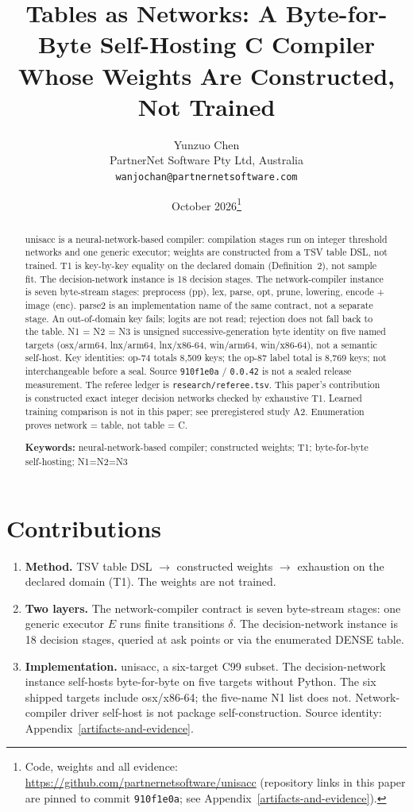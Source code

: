 \documentclass[11pt]{article}
\title{Tables as Networks: A Byte-for-Byte Self-Hosting C Compiler Whose Weights Are Constructed, Not Trained}
\author{Yunzuo Chen\\
PartnerNet Software Pty Ltd, Australia\\
\texttt{wanjochan@partnernetsoftware.com}}
\date{October 2026\thanks{Code, weights and all evidence: \url{https://github.com/partnernetsoftware/unisacc} (repository links in this paper are pinned to commit \texttt{910f1e0a}; see Appendix~\ref{artifacts-and-evidence}).}}
\begin{document}
\maketitle

\begin{abstract}
unisacc is a neural-network-based compiler: compilation stages run on integer threshold networks and one generic executor; weights are constructed from a TSV table DSL, not trained. T1 is key-by-key equality on the declared domain (Definition~2), not sample fit. The decision-network instance is 18 decision stages. The network-compiler instance is seven byte-stream stages: preprocess (pp), lex, parse, opt, prune, lowering, encode + image (enc). parse2 is an implementation name of the same contract, not a separate stage. An out-of-domain key fails; logits are not read; rejection does not fall back to the table. N1 = N2 = N3 is unsigned successive-generation byte identity on five named targets (osx/arm64, lnx/arm64, lnx/x86-64, win/arm64, win/x86-64), not a semantic self-host. Key identities: op-74 totals 8,509 keys; the op-87 label total is 8,769 keys; not interchangeable before a seal. Source \texttt{910f1e0a} / \texttt{0.0.42} is not a sealed release measurement. The referee ledger is \texttt{research/referee.tsv}. This paper's contribution is constructed exact integer decision networks checked by exhaustive T1. Learned training comparison is not in this paper; see preregistered study A2. Enumeration proves network = table, not table = C.

\medskip
\noindent\textbf{Keywords:} neural-network-based compiler; constructed weights; T1; byte-for-byte self-hosting; N1=N2=N3
\end{abstract}

\section{Contributions}\label{introduction}

\begin{enumerate}
\item \textbf{Method.} TSV table DSL $\to$ constructed weights $\to$ exhaustion on the declared domain (T1). The weights are not trained.
\item \textbf{Two layers.} The network-compiler contract is seven byte-stream stages: one generic executor $E$ runs finite transitions $\delta$. The decision-network instance is 18 decision stages, queried at ask points or via the enumerated DENSE table.
\item \textbf{Implementation.} unisacc, a six-target C99 subset. The decision-network instance self-hosts byte-for-byte on five targets without Python. The six shipped targets include osx/x86-64; the five-name N1 list does not. Network-compiler driver self-host is not package self-construction. Source identity: Appendix~\ref{artifacts-and-evidence}.
\end{enumerate}
\end{document}

